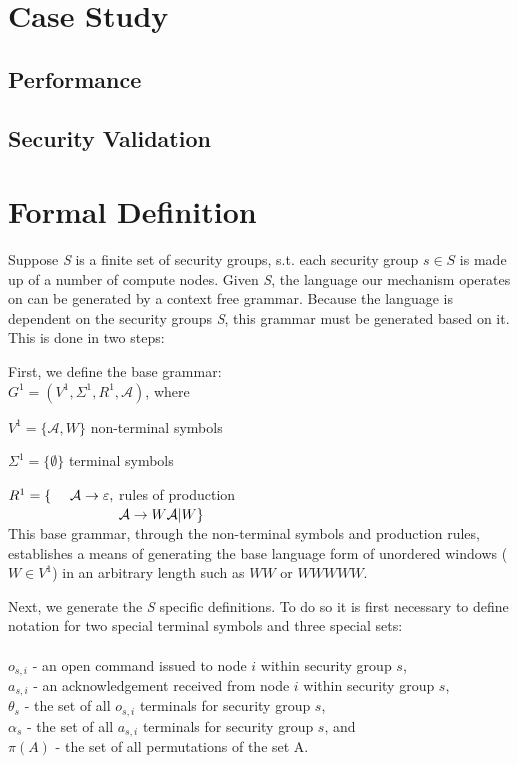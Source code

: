 \documentclass{article}
\newcommand{\tab}{\hspace*{2em}}
\begin{document}
\section{Case Study}
\subsection{Performance}
\subsection{Security Validation}
\section{Formal Definition}

Suppose \emph{S} is a finite set of security groups, s.t. each security group $s\in S$ is made up of a number of compute nodes. Given \emph{S}, the language our mechanism operates on can be generated by a context free grammar. Because the language is dependent on the security groups \emph{S}, this grammar must be generated based on it. This is done in two steps:

First, we define the base grammar:\\

\tab $G^1 = (V^1, \Sigma^1, R^1, \mathcal{A})$, where

\tab $V^1 = \{\mathcal{A} , W\}$ \hfill non-terminal symbols \hspace*{6em}

\tab $\Sigma ^1 = \{ \emptyset\}$ \hfill terminal symbols\hspace*{6.3em}

\tab $R^1 = \lbrace \hspace*{1.35em}\mathcal{A} \rightarrow \varepsilon ,$ \hfill rules of production \hspace*{6em} \\
$\tab \hspace*{5.9em} \mathcal{A}\rightarrow W\mathcal{A} |W\rbrace$\\

This base grammar, through the non-terminal symbols and production rules, establishes a means of generating the base language form of unordered windows ($W\in V^1$) in an arbitrary length such as $WW$ or $WWWWW$.

Next, we generate the \emph{S} specific definitions. To do so it is first necessary to define notation for two special terminal symbols and three special sets:\\
\\
$o_{s,i}$ - an open command issued to node $i$ within security group $s$,\\
$a_{s,i}$ - an acknowledgement received from node $i$ within security group $s$,\\
$\theta_s$ - the set of all $o_{s,i}$ terminals for security group $s$, \\
$\alpha_s$ - the set of all $a_{s,i}$ terminals for security group $s$, and \\
$\pi(A)$ - the set of all permutations of the set A.\\
\end{document}
